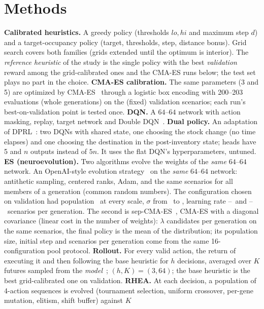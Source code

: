 \documentclass[conference,a4paper]{IEEEtran}
\begin{document}
\section{Methods}
\textbf{Calibrated heuristics.} A greedy policy (thresholds $lo,hi$ and maximum step $d$) and a target-occupancy policy (target, thresholds, step, distance bonus). Grid search
covers both families (grids extended until the optimum is interior). The \emph{reference heuristic} of the study is the single policy with the best \emph{validation}
reward among the grid-calibrated ones and the CMA-ES runs below; the test set plays no part in the choice.
\textbf{CMA-ES calibration.} The same parameters (3 and 5) are optimized by CMA-ES~\cite{hansen2001} through a logistic box encoding with 200--203 evaluations (whole generations) on the (fixed)
validation scenarios; each run's best-on-validation point is tested once.
\textbf{DQN.} A $64$--$64$ network with action masking, replay, target network and Double DQN~\cite{mnih2015,vanhasselt2016}.
\textbf{Dual policy.} An adaptation of DPRL~\cite{liang2024}: two DQNs with shared state, one choosing the stock change (no time elapses) and one choosing the destination
in the post-inventory state; heads have 5 and $n$ outputs instead of $5n$. It uses the flat DQN's hyperparameters, untuned.
\textbf{ES (neuroevolution).} Two algorithms evolve the weights of the \emph{same} $64$--$64$ network. An OpenAI-style evolution strategy~\cite{salimans2017} on the \emph{same} $64$--$64$ network: antithetic sampling, centered ranks,
Adam, and the same scenarios for all members of a generation (common random numbers). The configuration chosen on validation had population \cecEsPopMax\ at every
scale, $\sigma$ from \cecEsSigMin\ to \cecEsSigMax, learning rate \cecEsLrMin--\cecEsLrMax\ and \cecEsBsMin--\cecEsBsMax\ scenarios per generation.
The second is sep-CMA-ES~\cite{ros2008}, CMA-ES with a diagonal covariance (linear cost in the number of weights): $\lambda$ candidates per generation on the same
scenarios, the final policy is the mean of the distribution; its population size, initial step and scenarios per generation come from the same 16-configuration pool protocol.
\textbf{Rollout.} For every valid action, the return of executing it and then following the base heuristic for $h$ decisions, averaged over $K$ futures sampled from the
\emph{model}~\cite{bertsekas1997}; $(h,K)=(3,64)$; the base heuristic is the best grid-calibrated one on validation.
\textbf{RHEA.} At each decision, a population of 4-action sequences is evolved (tournament selection, uniform crossover, per-gene mutation, elitism, shift buffer) against $K$
\end{document}
